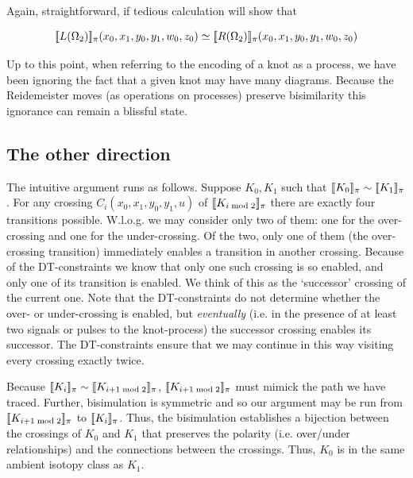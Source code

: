 \documentclass[]{llncs}
\begin{document}
Again, straightforward, if tedious calculation will show that

\begin{equation}
  [\![ L(\Omega_2) ]\!]_{\pi}(x_0,x_1,y_0,y_1,w_0,z_0) \simeq [\![ R(\Omega_2) ]\!]_{\pi}(x_0,x_1,y_0,y_1,w_0,z_0)
\end{equation}

\begin{remark}
  Up to this point, when referring to the encoding of a knot as a
  process, we have been ignoring the fact that a given knot may have
  many diagrams. Because the Reidemeister moves (as operations on
  processes) preserve bisimilarity this ignorance can remain a blissful
  state.
\end{remark}

\subsection{The other direction}

The intuitive argument runs as follows. Suppose $K_0, K_1$ such that
$[\![ K_0 ]\!]_{\pi} \sim [\![ K_1 ]\!]_{\pi}$. For any crossing
$C_i(x_{0},x_{1},y_{0},y_{1},u)$ of $[\![ K_{i \bmod 2} ]\!]_{\pi}$
there are exactly four transitions possible. W.l.o.g. we may consider
only two of them: one for the over-crossing and one for the
under-crossing. Of the two, only one of them (the over-crossing
transition) immediately enables a transition in another
crossing. Because of the DT-constraints we know that only one such
crossing is so enabled, and only one of its transition is enabled. We
think of this as the `successor' crossing of the current one. Note
that the DT-constraints do not determine whether the over- or
under-crossing is enabled, but \emph{eventually} (i.e. in the presence
of at least two signals or pulses to the knot-process) the successor
crossing enables its successor. The DT-constraints ensure that we may
continue in this way visiting every crossing exactly twice.

Because $[\![ K_{i} ]\!]_{\pi} \sim [\![ K_{i+1 \bmod
    2} ]\!]_{\pi}$, $[\![ K_{i+1 \bmod 2} ]\!]_{\pi}$ must mimick the
path we have traced. Further, bisimulation is symmetric and so our
argument may be run from $[\![ K_{i+1 \bmod 2} ]\!]_{\pi}$ to
$[\![ K_{i} ]\!]_{\pi}$. Thus, the bisimulation establishes a
bijection between the crossings of $K_{0}$ and $K_{1}$ that preserves
the polarity (i.e. over/under relationships) and the connections
between the crossings. Thus, $K_{0}$ is in the same ambient isotopy
class as $K_{1}$.
\end{document}
